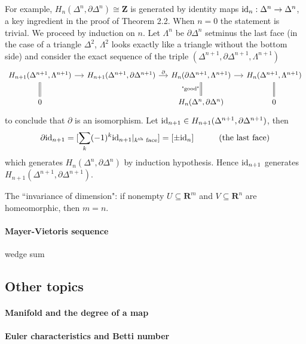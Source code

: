 \documentclass[11pt]{article}
\theoremstyle{definition}
\theoremstyle{plain}
\newcommand{\id}{\textup{id}}
\newcommand{\R}{\mathbf{R}}
\newcommand{\Z}{\mathbf{Z}}
\newcommand{\1}{\mathbf{1}}
\begin{document}
For example, $H_n(\Delta^n,\partial\Delta^n)\cong\Z$ is generated by identity maps $\id_n:\Delta^n\to\Delta^n$, a key ingredient in the proof of Theorem 2.2. When $n=0$ the statement is trivial. We proceed by induction on $n$. Let $\Lambda^n$ be $\partial\Delta^n$ setminus the last face (in the case of a triangle $\Delta^2$, $\Lambda^2$ looks exactly like a triangle without the bottom side) and consider the exact sequence of the triple $(\Delta^{n+1},\partial\Delta^{n+1},\Lambda^{n+1})$
\[\begin{tikzcd}[column sep=small]
H_{n+1}(\Delta^{n+1},\Lambda^{n+1})\arrow[d,equal]\arrow[r]&H_{n+1}(\Delta^{n+1},\partial\Delta^{n+1})\arrow{r}{\partial}&H_n(\partial\Delta^{n+1},\Lambda^{n+1})\arrow[equal,d,"\textrm{"good"}"']\arrow[r]&H_n(\Delta^{n+1},\Lambda^{n+1})\arrow[equal,d]\\
0&&H_n(\Delta^n,\partial\Delta^n)&0
\end{tikzcd}\]
to conclude that $\partial$ is an isomorphism. Let $\id_{n+1}\in H_{n+1}(\Delta^{n+1},\partial\Delta^{n+1})$, then
\begin{align*}
\partial \id_{n+1}=[\sum_k(-1)^k\id_{n+1}|_{k^{\textrm{th}}\textrm{ face}}]=[\pm\id_n]\quad\quad\quad\textrm{(the last face)}
\end{align*}
which generates $H_n(\Delta^n,\partial\Delta^n)$ by induction hypothesis. Hence $\id_{n+1}$ generates $H_{n+1}(\Delta^{n+1},\partial\Delta^{n+1})$.\medbreak

The ``invariance of dimension": if nonempty $U\subseteq\R^m$ and $V\subseteq\R^n$ are homeomorphic, then $m=n$. 

\paragraph{Mayer-Vietoris sequence}

wedge sum

\newpage
\subsection{Other topics}

\paragraph{Manifold and the degree of a map}

\paragraph{Euler characteristics and Betti number}
\end{document}
